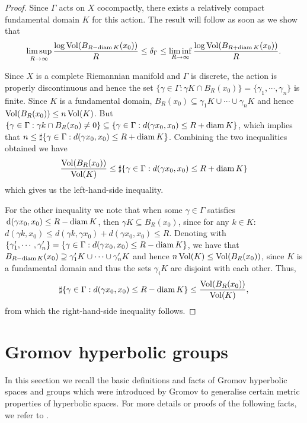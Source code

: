 \documentclass{report}
\begin{document}
\begin{proof}
    Since $\Gamma$ acts on $X$ cocompactly, there exists a relatively compact fundamental domain $K$ for this action.
    The result will follow as soon as we show that 
    \begin{align*}
        \limsup_{R \to \infty} \frac{\log \operatorname{Vol}(B_{R-\operatorname{diam} K}(x_0))}{R} \leq \delta_\Gamma \leq
        \liminf_{R \to \infty} \frac{\log \operatorname{Vol}(B_{R + \operatorname{diam} K}(x_0))}{R}.
    \end{align*}

    Since $X$ is a complete Riemannian manifold and $\Gamma$ is discrete, the action is properly discontinuous and hence the set $\{\gamma \in \Gamma : \gamma K \cap B_R(x_0)\} = \{ \gamma_1, \cdots, \gamma_n\}$ is finite.
    Since $K$ is a fundamental domain, $B_R(x_0) \subseteq \gamma_1 K \cup \cdots \cup \gamma_n K$ and hence $\operatorname{Vol}(B_R(x_0)) \leq n  \operatorname{Vol}(K)$.
    But $ \{\gamma \in \Gamma: \gamma k \cap B_R(x_0) \neq 0 \} \subseteq \{ \gamma \in \Gamma : d(\gamma x_0 , x_0) \leq R + \operatorname{diam} K \}$, which implies that $n \leq \sharp \{ \gamma \in \Gamma : d(\gamma x_0, x_0) \leq R + \operatorname{diam} K \}$.
    Combining the two inequalities obtained we have
    \begin{equation*}
        \frac{\operatorname{Vol}(B_R(x_0))}{\operatorname{Vol}(K)} \leq \sharp \{\gamma \in \Gamma : d(\gamma x_0, x_0) \leq R+ \operatorname{diam} K\}
    \end{equation*}
    which gives us the left-hand-side inequality.

    For the other inequality we note that when some $\gamma \in \Gamma$ satisfies $\,\mathrm{d}(\gamma x_0, x_0) \leq R - \operatorname{diam} K$, then $\gamma K \subseteq B_R(x_0)$, since for any $k \in K$:
    $d(\gamma k, x_0) \leq d(\gamma k, \gamma x_0) + d(\gamma x_0, x_0) \leq R$.
    Denoting with $\{ \gamma_1', \cdots, \gamma_n' \} = \{ \gamma \in \Gamma : d(\gamma x_0, x_0) \leq R - \operatorname{diam} K \}$, we have that $B_{R-\operatorname{diam} K}(x_0) \supseteq \gamma_1' K \cup \cdots \cup \gamma_n' K$ and hence $n \operatorname{Vol}(K) \leq \operatorname{Vol}(B_R(x_0))$, since $K$ is a fundamental domain and thus the sets $\gamma_i K$ are disjoint with each other.
    Thus,
    \[
    \sharp \{ \gamma \in \Gamma : d(\gamma x_0, x_0) \leq R - \operatorname{diam} K \} \leq \frac{\operatorname{Vol}(B_R(x_0))}{\operatorname{Vol}(K)},
    \]
    from which the right-hand-side inequality follows.
\end{proof}

\section{Gromov hyperbolic groups}
In this seection we recall the basic definitions and facts of Gromov hyperbolic spaces and groups which were introduced by Gromov to generalise certain metric properties of hyperbolic spaces.
For more details or proofs of the following facts, we refer to \cite{ghys2013groupes}.
\end{document}

